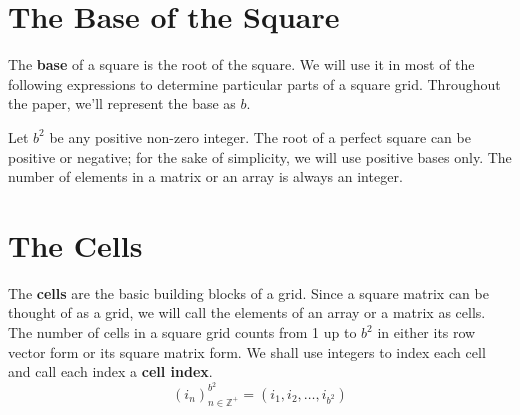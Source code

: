 \documentclass[letterpaper, twoside,12pt]{book}
\begin{document}
    \section{The Base of the Square} \label{base}
    The \textbf{base} of a square is the root of the square. We will use it in most of the following expressions to determine particular parts of a square grid. Throughout the paper, we'll represent the base as $b$. 

    Let $b^2$ be any positive non-zero integer. The root of a perfect square can be positive or negative; for the sake of simplicity, we will use positive bases only. The number of elements in a matrix or an array is always an integer.

    \section{The Cells} \label{cells}
    The \textbf{cells} are the basic building blocks of a grid. Since a square matrix can be thought of as a grid, we will call the elements of an array or a matrix as cells. The number of cells in a square grid counts from 1 up to $b^2$ in either its row vector form or its square matrix form. We shall use integers to index each cell and call each index a \textbf{cell index}.
    \begin{equation}
        (i_n)^{b^2}_{n\in\mathbb{Z}^+} = (i_1, i_2, \dots ,i_{b^2})
    \end{equation}
\end{document}
